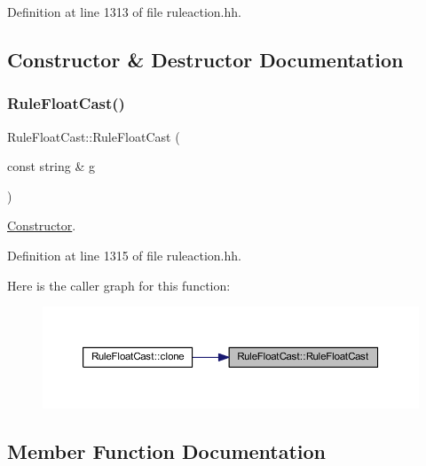 Definition at line 1313 of file ruleaction.\+hh.



\subsection{Constructor \& Destructor Documentation}
\mbox{\label{class_rule_float_cast_a5b48a32e37d7737d898b0e7de198890e}} 
\subsubsection{\texorpdfstring{RuleFloatCast()}{RuleFloatCast()}}
{\footnotesize\ttfamily Rule\+Float\+Cast\+::\+Rule\+Float\+Cast (\begin{DoxyParamCaption}\item[{const string \&}]{g }\end{DoxyParamCaption})\hspace{0.3cm}{\ttfamily [inline]}}



\mbox{\hyperlink{class_constructor}{Constructor}}. 



Definition at line 1315 of file ruleaction.\+hh.

Here is the caller graph for this function\+:
\nopagebreak
\begin{figure}[H]
\begin{center}
\leavevmode
\includegraphics[width=350pt]{class_rule_float_cast_a5b48a32e37d7737d898b0e7de198890e_icgraph}
\end{center}
\end{figure}


\subsection{Member Function Documentation}
\mbox{\label{class_rule_float_cast_aa220e61357bdc27e129e2f2dda089c1f}} 
